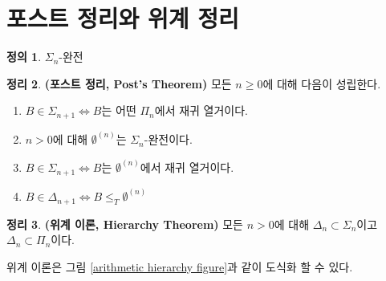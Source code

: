 \documentclass[b5paper, 11pt]{book}
\theoremstyle{definition}
\newtheorem{defn}{정의}[chapter]
\newtheorem{thm}[defn]{정리}
\newenvironment{pf*}{\pushQED{\qed}\pf}
{\popQED\endpf}
\begin{document}
\section{포스트 정리와 위계 정리}
\begin{defn}
    $\Sigma_n$-완전
\end{defn}
\begin{thm}
    \textbf{(포스트 정리, Post's Theorem)} 모든 $n \ge 0$에 대해 다음이 성립한다.
    \begin{enumerate}
        \item $B \in \Sigma_{n+1} \Leftrightarrow B$는 어떤 $\Pi_n$에서 재귀 열거이다.
        \item $n > 0$에 대해 $\emptyset^{(n)}$는 $\Sigma_n$-완전이다.
        \item $B \in \Sigma_{n+1} \Leftrightarrow B$는 $\emptyset^{(n)}$에서 재귀 열거이다.
        \item $B \in \Delta_{n+1} \Leftrightarrow B \le_T \emptyset^{(n)}$  
    \end{enumerate}
\end{thm}
\begin{pf*}
    
\end{pf*}
\begin{thm}
    \textbf{(위계 이론, Hierarchy Theorem)} 모든 $n > 0$에 대해 $\Delta_n \subset \Sigma_n$이고 $\Delta_n \subset \Pi_n$이다. 
\end{thm}
위계 이론은 그림 \ref{arithmetic hierarchy figure}과 같이 도식화 할 수 있다.
\end{document}
